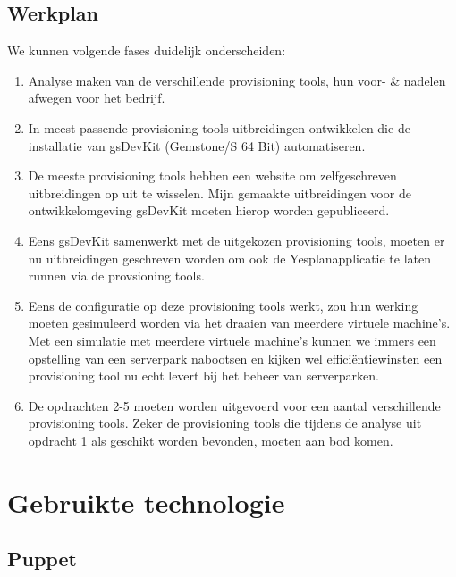 \documentclass[a4paper,11pt]{article}
\theoremstyle{definition}
\begin{document}
\subsection{Werkplan}
We kunnen volgende fases duidelijk onderscheiden:

\begin{enumerate}
  \item Analyse maken van de verschillende provisioning tools, hun voor- \& 
  nadelen afwegen voor het bedrijf.
  \item In meest passende provisioning tools uitbreidingen ontwikkelen die de 
  installatie van gsDevKit (Gemstone/S 64 Bit) automatiseren.
  \item De meeste provisioning tools hebben een website om zelfgeschreven 
  uitbreidingen op uit te wisselen. Mijn gemaakte uitbreidingen voor de 
  ontwikkelomgeving gsDevKit moeten hierop worden gepubliceerd.
  \item Eens gsDevKit samenwerkt met de uitgekozen provisioning tools, moeten 
  er nu uitbreidingen geschreven worden om ook de Yesplanapplicatie te laten 
  runnen via de provsioning tools.

  \item Eens de configuratie op deze provisioning tools werkt, zou hun werking moeten 
  gesimuleerd worden via het draaien van meerdere virtuele machine's. Met een simulatie met meerdere virtuele machine's
  kunnen we immers een opstelling van een serverpark nabootsen en kijken wel efficiëntiewinsten een provisioning tool nu echt levert bij het beheer
  van serverparken.
    
    \item De opdrachten 2-5 moeten worden uitgevoerd voor een aantal verschillende provisioning 
    tools. Zeker de provisioning tools die tijdens de analyse uit opdracht 1 als geschikt worden 
    bevonden, moeten aan bod komen.
    
    \end{enumerate}
\newpage
\section{Gebruikte technologie}
\subsection{Puppet}
\end{document}
